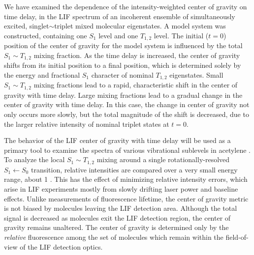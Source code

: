 We have examined the dependence of the intensity-weighted center of
gravity on time delay, in the LIF spectrum of an incoherent ensemble
of simultaneously excited, singlet$\sim$triplet mixed molecular
eigenstates.  A model system was constructed, containing one $S_1$
level and one $T_{1,2}$ level.  The initial ($t=0$) position of the
center of gravity for the model system is influenced by the total $S_1
\sim T_{1,2}$ mixing fraction.  As the time delay is increased, the
center of gravity shifts from its initial position to a final
position, which is determined solely by the energy and fractional
$S_1$ character of nominal $T_{1,2}$ eigenstates.  Small $S_1 \sim
T_{1,2}$ mixing fractions lead to a rapid, characteristic shift in the
center of gravity with time delay.  Large mixing fractions lead to a
gradual change in the center of gravity with time delay.  In this
case, the change in center of gravity not only occurs more slowly, but
the total magnitude of the shift is decreased, due to the larger
relative intensity of nominal triplet states at $t=0$.

The behavior of the LIF center of gravity with time delay will be used
as a primary tool to examine the spectra of various vibrational
sublevels in acetylene \astate.  To analyze the local $S_1 \sim
T_{1,2}$ mixing around a single rotationally-resolved $S_1 \leftarrow
S_0$ transition, relative intensities are compared over a very small
energy range, about 1 \rcm.  This has the effect of minimizing
relative intensity errors, which arise in LIF experiments mostly from
slowly drifting laser power and baseline effects.  Unlike measurements
of fluorescence lifetime, the center of gravity metric is not biased
by molecules leaving the LIF detection area.  Although the total
signal is decreased as molecules exit the LIF detection region, the
center of gravity remains unaltered.  The center of gravity is
determined only by the \emph{relative} fluorescence among the set of
molecules which remain within the field-of-view of the LIF detection
optics.


























